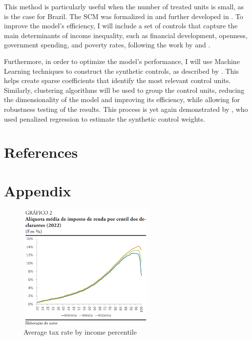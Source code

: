 \documentclass[a4paper, 12pt]{article}
\begin{document}
This method is particularly useful when the number of treated units is small, as is the case for Brazil.
The SCM was formalized in \cite{abadie2003economic} and further developed in \cite{abadie2010synthetic}.
To improve the model’s efficiency, I will include a set of controls that capture the main determinants of income inequality, such as financial development, openness, government spending, and poverty rates, following the work by \cite{afandi2017determinants} and \cite{roine2009long}.
\pagebreak
\par
Furthermore, in order to optimize the model’s performance, I will use Machine Learning techniques to construct the synthetic controls, as described by \cite{araujo2023synthetic}.
This helps create sparse coefficients that identify the most relevant control units.
Similarly, clustering algorithms will be used to group the control units, reducing the dimensionality of the model and improving its efficiency, while allowing for robustness testing of the results.
This process is yet again demonstrated by \cite{abadie2023penalized}, who used penalized regression to estimate the synthetic control weights.

\newpage

\section*{References}

\printbibliography[heading=none]
\newpage

\section*{Appendix}

\begin{figure}[H]
    \centering
    \includegraphics[width=0.6\textwidth]{aliquota.png}
    \caption{Average tax rate by income percentile}
    \label{tab:Figure 1}
\end{figure}
\end{document}
